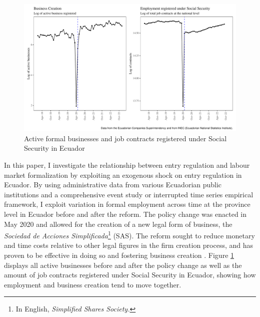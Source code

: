 \documentclass[11pt,a4paper]{article}\usepackage[]{graphicx}\usepackage[]{xcolor}
\makeatletter
\def\maxwidth{ %
  \ifdim\Gin@nat@width>\linewidth
    \linewidth
  \else
    \Gin@nat@width
  \fi
}
\newenvironment{knitrout}{}{} %
\makeatother
\begin{document}
\begin{figure}[h]
\caption{Active formal businesses and job contracts registered under Social Security in Ecuador}
\label{fig:fig}
\begin{knitrout}
\color{fgcolor}
\includegraphics[width=\maxwidth]{figure/figure-1-1} 
\end{knitrout}
\end{figure}

In this paper, I investigate the relationship between entry regulation and labour market formalization by exploiting an exogenous shock on entry regulation in Ecuador. By using administrative data from various Ecuadorian public institutions and a comprehensive event study or interrupted time series empirical framework, I exploit variation in formal employment across time at the province level in Ecuador before and after the reform. The policy change was enacted in May 2020 and allowed for the creation of a new legal form of business, the \textit{Sociedad de Acciones Simplificada}\footnote{In English, \textit{Simplified Shares Society.}} (SAS). The reform sought to reduce monetary and time costs relative to other legal figures in the firm creation process, and has proven to be effective in doing so and fostering business creation \parencite{CaminoMogro.2022}. Figure \ref{fig:fig} displays all active businesses before and after the policy change as well as the amount of job contracts registered under Social Security in Ecuador, showing how employment and business creation tend to move together.
\end{document}
